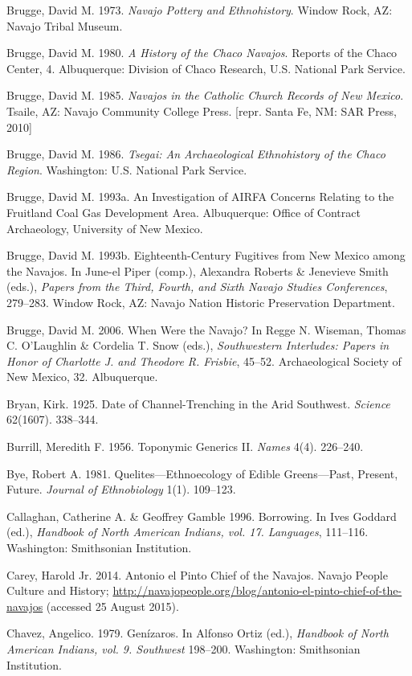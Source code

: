 \begin{hang}
	Brugge, David M. 1973. \textit{Navajo Pottery and Ethnohistory}.  Window Rock, AZ:  Navajo Tribal Museum.

	Brugge, David M. 1980.  \textit{A History of the Chaco Navajos}.  Reports of the Chaco Center, 4.  Albuquerque:  Division of Chaco Research, U.S. National Park Service.

	Brugge, David M. 1985. \textit{Navajos in the Catholic Church Records of New Mexico}.  Tsaile, AZ:  Navajo Community College Press.  [repr. Santa Fe, NM:  SAR Press, 2010]

	Brugge, David M. 1986. \textit{Tsegai: An Archaeological Ethnohistory of the Chaco Region}.  Washington:  U.S. National Park Service.

	Brugge, David M. 1993a. An Investigation of AIRFA Concerns Relating to the Fruitland Coal Gas Development Area.  Albuquerque:  Office of Contract Archaeology, University of New Mexico.

	Brugge, David M. 1993b.  Eighteenth-Century Fugitives from New Mexico among the Navajos.  In June-el Piper (comp.), Alexandra Roberts \& Jenevieve Smith (eds.), \textit{Papers from the Third, Fourth, and Sixth Navajo Studies Conferences}, 279--283.  Window Rock, AZ:  Navajo Nation Historic Preservation Department.

	Brugge, David M. 2006.  When Were the Navajo? In Regge N. Wiseman, Thomas C. O’Laughlin \& Cordelia T. Snow (eds.), \textit{Southwestern Interludes: Papers in Honor of Charlotte J. and Theodore R. Frisbie}, 45--52.  Archaeological Society of New Mexico, 32.  Albuquerque.

	Bryan, Kirk.  1925.  Date of Channel-Trenching in the Arid Southwest.  \textit{Science} 62(1607). 338--344.

	Burrill, Meredith F.  1956.  Toponymic Generics II.  \textit{Names} 4(4). 226--240.

	Bye, Robert A. 1981.  Quelites—Ethnoecology of Edible Greens—Past, Present, Future.  \textit{Journal of Ethnobiology} 1(1). 109--123.

	Callaghan, Catherine A. \& Geoffrey Gamble  1996.  Borrowing. In Ives Goddard (ed.), \textit{Handbook of North American Indians, vol. 17.  Languages}, 111--116.  Washington:  Smithsonian Institution.

	Carey, Harold Jr.  2014.  Antonio el Pinto Chief of the Navajos.  Navajo People Culture and History; \url{http://navajopeople.org/blog/antonio-el-pinto-chief-of-the-navajos} (accessed 25 August 2015).

	Chavez, Angelico. 1979.  Genízaros.  In Alfonso Ortiz (ed.), \textit{Handbook of North American Indians, vol. 9.  Southwest}  198--200.  Washington:  Smithsonian Institution.


\end{hang}
